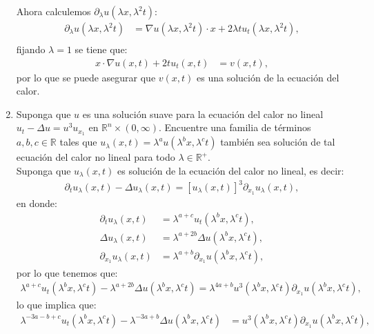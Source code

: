 \begin{homeworkProblem}
\begin{solucion}
\begin{enumerate}
        Ahora calculemos $\partial_{\lambda}u(\lambda x,\lambda^2 t)$:
        \begin{align*}
          \partial_{\lambda}u(\lambda x,\lambda^2 t)&=\nabla u (\lambda x,\lambda^2 t)\cdot x+2\lambda tu_{t}(\lambda x,\lambda^2 t),\\
        \end{align*}
        fijando $\lambda=1$ se tiene que:
        \begin{align*}
          x\cdot \nabla u(x,t)+2tu_t(x,t)&=v(x,t),
        \end{align*}
        por lo que se puede asegurar que $v(x,t)$ es una solución de la ecuación del calor.
        \demostrado
      \item Suponga que $u$ es una solución suave para la ecuación del calor no lineal $u_t-\Delta u=u^3u_{x_1}$ en $\mathbb{R}^{n}\times (0,\infty)$. Encuentre una familia de términos $a,b,c\in\mathbb{R}$ tales que $u_\lambda(x,t)=\lambda^au(\lambda^bx,\lambda^ct)$ también sea solución de tal ecuación del calor no lineal para todo $\lambda\in\mathbb{R}^{+}$.\\
        Suponga que $u_{\lambda}(x,t)$ es solución de la ecuación del calor no lineal, es decir:
        \begin{align*}
          \partial_{t}u_{\lambda}(x,t)-\Delta u_{\lambda}(x,t)=[u_{\lambda}(x,t)]^3\partial_{x_1}u_{\lambda}(x,t),
        \end{align*}
        en donde:
        \begin{align*}
          \partial_{t}u_{\lambda}(x,t)&=\lambda^{a+c}u_t(\lambda^{b}x,\lambda^{c}t),\\
          \Delta u_{\lambda}(x,t)&=\lambda^{a+2b}\Delta u(\lambda^{b}x,\lambda^{c}t),\\
          \partial_{x_1}u_{\lambda}(x,t)&=\lambda^{a+b}\partial_{x_1}u(\lambda^{b}x,\lambda^{c}t),
        \end{align*}
        por lo que tenemos que:
        \begin{align*}
          \lambda^{a+c}u_{t}(\lambda^{b}x,\lambda^{c}t)-\lambda^{a+2b}\Delta u(\lambda^{b}x,\lambda^{c}t)=\lambda^{4a+b}u^3(\lambda^{b}x,\lambda^{c}t)\partial_{x_1}u(\lambda^{b}x,\lambda^{c}t),
        \end{align*}
        lo que implica que:
        \begin{align*}
          \lambda^{-3a-b+c}u_{t}(\lambda^{b}x,\lambda^{c}t)-\lambda^{-3a+b}\Delta u(\lambda^{b}x,\lambda^{c}t)&=u^3(\lambda^{b}x,\lambda^{c}t)\partial_{x_1}u(\lambda^{b}x,\lambda^{c}t),\\

\end{align*}
\end{enumerate}
\end{solucion}
\end{homeworkProblem}
